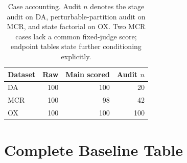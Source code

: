 \documentclass[letterpaper]{article}
\begin{document}
\begin{table}[tb]
\centering
\small
\begin{tabular}{@{}lrrr@{}}
\toprule
Dataset & Raw & Main scored & Audit $n$ \\
\midrule
DA & 100 & 100 & 20 \\
MCR & 100 & 98 & 42 \\
OX & 100 & 100 & 100 \\
\bottomrule
\end{tabular}
\caption{Case accounting. Audit $n$ denotes the stage audit on DA, perturbable-partition audit on MCR, and state factorial on OX. Two MCR cases lack a common fixed-judge score; endpoint tables state further conditioning explicitly.}
\label{tab:case-accounting}
\end{table}

\section{Complete Baseline Table}
\end{document}
